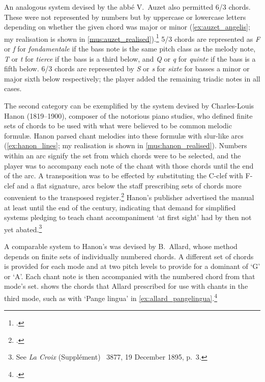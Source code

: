 %
An analogous system devised by the abbé V.\ Auzet also permitted 6/3 chords.
These were not represented by numbers but by uppercase or lowercase letters depending on whether the given chord was major or minor (\cref{ex:auzet_angelis}; my realisation is shown in \cref{mus:auzet_realised}).\footcite[64]{Auzetaccompagnementartistiqueplainchant1891}
5/3 chords are represented as \textit{F} or \textit{f} for \emph{fondamentale} if the bass note is the same pitch class as the melody note, \textit{T} or \textit{t} for \emph{tierce} if the bass is a third below, and \textit{Q} or \textit{q} for \emph{quinte} if the bass is a fifth below.
6/3 chords are represented by \textit{S} or \textit{s} for \emph{sixte} for basses a minor or major sixth below respectively; the player added the remaining triadic notes in all cases.

The second category can be exemplified by the system devised by Charles-Louis Hanon (1819--1900), composer of the notorious piano studies, who defined finite sets of chords to be used with what were believed to be common melodic formulæ.
Hanon parsed chant melodies into these formulæ with slur-like arcs (\cref{ex:hanon_lines}; my realisation is shown in \cref{mus:hanon_realised}).
Numbers within an arc signify the set from which chords were to be selected, and the player was to accompany each note of the chant with those chords until the end of the arc.
A transposition was to be effected by substituting the C-clef with F-clef and a flat signature, arcs below the staff prescribing sets of chords more convenient to the transposed register.\footcite[52]{HanonSystemenouveaupratique1860}
Hanon's publisher advertised the manual at least until the end of the century, indicating that demand for simplified systems pledging to teach chant accompaniment `at first sight' had by then not yet abated.\footnote{See \emph{La Croix} (Supplément) \textnumero{}~3877, 19 December 1895, p.~3.}

%
A comparable system to Hanon's was devised by B.\ Allard, whose method depends on finite sets of individually numbered chords.
A different set of chords is provided for each mode and at two pitch levels to provide for a dominant of `G' or `A'.
Each chant note is then accompanied with the numbered chord from that mode's set.
 shows the chords that Allard prescribed for use with chants in the third mode, such as with `Pange lingua' in \cref{ex:allard_pangelingua}.\footcite[36--7]{AllardTranspositionaccompagnementplain1880}

